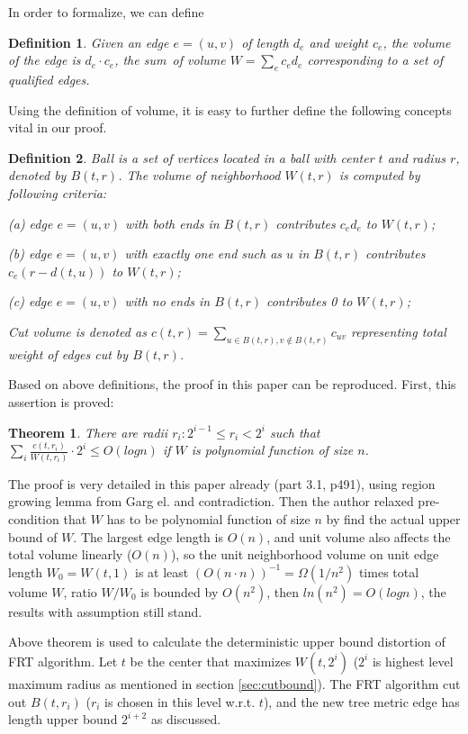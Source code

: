 \documentclass[11pt,twoside, onecolumn]{IEEEtran}
\newtheorem{Definition}{Definition}[section]
\newtheorem{Theorem}{Theorem}[section]
\begin{document}
In order to formalize, we can define
\begin{Definition}
Given an edge $e = (u,v)$ of length $d_e$ and weight $c_e$, the \emph{volume} of the edge is $d_e\cdot c_e$,
the \emph{sum\ of volume} $W = \sum_ec_ed_e$ corresponding to a set of qualified edges.
\end{Definition}

Using the definition of volume, it is easy to further define the following concepts vital in our proof.

\begin{Definition}
\emph{Ball} is a set of vertices located in a ball with center $t$ and radius $r$, denoted by $B(t,r)$.
The \emph{volume of neighborhood} $W(t,r)$ is computed by following criteria:\par
(a) edge $e=(u,v)$ with both ends in $B(t,r)$ contributes $c_ed_e$ to $W(t,r)$;\par
(b) edge $e=(u,v)$ with exactly one end such as $u$ in $B(t,r)$ contributes $c_e(r-d(t,u))$ to $W(t,r)$;\par
(c) edge $e=(u,v)$ with no ends in $B(t,r)$ contributes 0 to $W(t,r)$;\par
\emph{Cut volume} is denoted as $c(t,r)=\sum_{u\in B(t,r),v\notin B(t,r)}c_{uv}$ representing total weight of
edges cut by $B(t,r)$.
\end{Definition}

Based on above definitions, the proof in this paper can be reproduced. First, this assertion is proved:
\begin{Theorem}
There are radii $r_i: 2^{i-1}\leq r_i < 2^i$ such that $\sum_i\frac{c(t,r_i)}{W(t,r_i)}\cdot 2^i \leq O(logn)$
if $W$ is polynomial function of size $n$.
\end{Theorem}

The proof is very detailed in this paper already (part 3.1, p491), using region growing lemma from Garg el.\cite{Garg}
and contradiction. Then the author relaxed pre-condition that $W$ has to be polynomial function of 
size $n$ by find the actual upper bound of $W$. The largest edge length is $O(n)$, and unit volume
also affects the total volume linearly ($O(n)$), so the unit neighborhood volume on unit edge length $W_0 = W(t,1)$ is at least $(O(n\cdot n))^{-1} = \Omega(1/n^2)$ times total volume $W$, ratio $W/W_0$ is bounded
by $O(n^2)$, then $ln(n^2) = O(logn)$, the results with assumption still stand.

Above theorem is used to calculate the deterministic upper bound distortion of FRT algorithm.
Let $t$ be the center that maximizes $W(t,2^i)$ ($2^i$ is highest level maximum radius as mentioned in 
section \ref{sec:cutbound}). The FRT algorithm cut out $B(t,r_i)$ ($r_i$ is chosen in this level w.r.t. $t$),
and the new tree metric edge has length upper bound $2^{i+2}$ as discussed.
\end{document}
